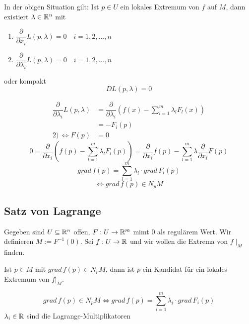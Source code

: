 \documentclass[main.tex]{subfiles}
\begin{document}
\begin{Theorem}
  In der obigen Situation gilt: Ist $p \in U$ ein lokales Extremum von $f$ auf $M$, dann existiert $\lambda \in \mathbb{R}^n$ mit
  \begin{enumerate}
    \item $\dfrac{\partial}{\partial x_i} L(p,\lambda) = 0 \quad i =1,2,...,n$
    \item $\dfrac{\partial}{\partial \lambda_i} L(p,\lambda) = 0 \quad i =1,2,...,n$
  \end{enumerate}
  oder kompakt
  $$DL(p,\lambda) = 0$$
\end{Theorem}

\begin{Beweis}
  $$\begin{aligned}
    \dfrac{\partial}{\partial \lambda_i} L(p,\lambda) & = \dfrac{\partial}{\partial \lambda_i} \left(f(x) - \sum \limits_{l=1}^m\lambda_lF_l(x) \right) \\
    & = -F_i(p) \\
    2) \, \Leftrightarrow F(p) & = 0
  \end{aligned}$$
  $$0 = \dfrac{\partial}{\partial x_i}\left(f(p) - \sum \limits_{l=1}^m \lambda_l F_l(p)\right) = \dfrac{\partial}{\partial x_i} f(p) - \sum \limits_{l=1}^m \lambda \dfrac{\partial}{\partial x_i} F(p)$$
  $$grad \, f(p) = \sum \limits_{l=1}^m \lambda_l \cdot grad \, F_l(p)$$
  $$\Leftrightarrow grad \, f(p) \in N_p M$$
\end{Beweis}

\subsection{Satz von Lagrange}

Gegeben sind $U \subseteq \mathbb{R}^n$ offen, $F: U \to \mathbb{R}^m$ mimt $0$ als regulärem Wert. Wir definieren $M := F^{-1}(0)$. Sei $f: U \to \mathbb{R}$ und wir wollen die Extrema von $f\mid_M$ finden.

\begin{Theorem}
  Ist $p \in M$ mit $grad \, f(p) \in N_p M$, dann ist $p$ ein Kandidat für ein lokales Extremum von $f |_M$.
\end{Theorem}

\begin{Beweis}
  $$grad \, f(p) \in N_p M \Leftrightarrow grad \, f(p) = \sum \limits_{i=1}^m \lambda_i \cdot grad \, F_i(p)$$
  $\lambda_i \in \mathbb{R}$ sind die Lagrange-Multiplikatoren
\end{Beweis}
\end{document}
